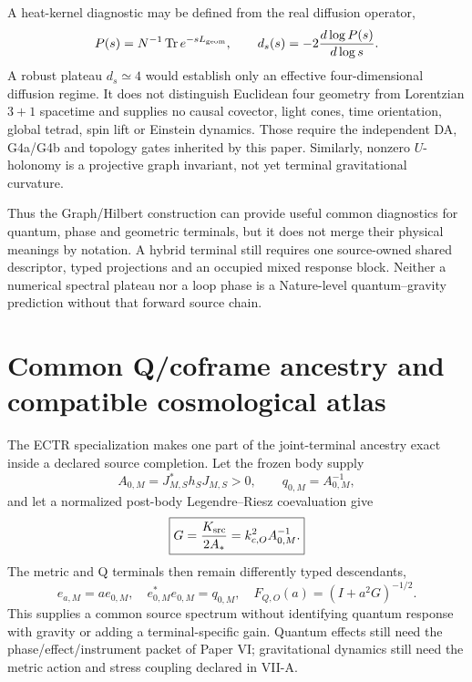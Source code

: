 \documentclass[11pt]{article}
\begin{document}
A heat-kernel diagnostic may be defined from the real diffusion operator,
\begin{equation}
 P(s)=N^{-1}\operatorname{Tr}e^{-sL_{\rm geom}},
 \qquad
 d_s(s)=-2\frac{d\log P(s)}{d\log s}.
 \label{eq:paperVII-spectral-dimension}
\end{equation}
A robust plateau $d_s\simeq4$ would establish only an effective
four-dimensional diffusion regime.  It does not distinguish Euclidean four
geometry from Lorentzian $3+1$ spacetime and supplies no causal covector,
light cones, time orientation, global tetrad, spin lift or Einstein dynamics.
Those require the independent DA, G4a/G4b and topology gates inherited by
this paper.  Similarly, nonzero $U$-holonomy is a projective graph invariant,
not yet terminal gravitational curvature.

Thus the Graph/Hilbert construction can provide useful common diagnostics
for quantum, phase and geometric terminals, but it does not merge their
physical meanings by notation.  A hybrid terminal still requires one
source-owned shared descriptor, typed projections and an occupied mixed
response block.  Neither a numerical spectral plateau nor a loop phase is a
Nature-level quantum--gravity prediction without that forward source chain.

\section{Common Q/coframe ancestry and compatible cosmological atlas}

The ECTR specialization makes one part of the joint-terminal ancestry exact
inside a declared source completion.  Let the frozen body supply
\begin{equation}
 A_{0,M}=J_{M,S}^*h_SJ_{M,S}>0,
 \qquad q_{0,M}=A_{0,M}^{-1},
 \label{eq:viia-ectr-body-metric}
\end{equation}
and let a normalized post-body Legendre--Riesz coevaluation give
\begin{equation}
 \boxed{G=\frac{K_{\rm src}}{2A_*}=k_{c,O}^2A_{0,M}^{-1}.}
 \label{eq:viia-ectr-common-source}
\end{equation}
The metric and Q terminals then remain differently typed descendants,
\begin{equation}
 e_{a,M}=ae_{0,M},\quad e_{0,M}^*e_{0,M}=q_{0,M},\quad F_{Q,O}(a)=(I+a^2G)^{-1/2}.
 \label{eq:viia-ectr-descendants}
\end{equation}
This supplies a common source spectrum without identifying quantum response
with gravity or adding a terminal-specific gain.  Quantum effects still need
the phase/effect/instrument packet of Paper VI; gravitational dynamics still
need the metric action and stress coupling declared in VII-A.
\end{document}
